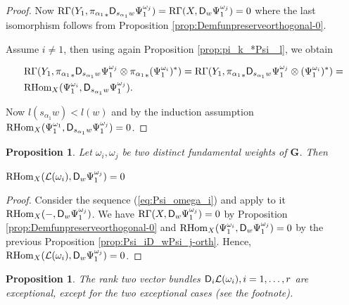 \documentclass[sn-mathphys-num]{sn-jnl}%
\newcommand{\Ll}{\mathcal L}
\newcommand*{\RGamma}{\mathop{\mathrm {R\Gamma}}\nolimits}
\newcommand*{\RHom}{\mathop{\mathrm {RHom}}\nolimits}
\newcommand{\sd}{\sf D}
\newcommand{\bg}{\mathbf G}
\newtheorem{proposition}[theorem]{Proposition}
\theoremstyle{definition}
\begin{document}
\begin{proof}
Now $\RGamma (Y_1,{\pi _{\alpha _1}}_{\ast}{\sf D}_{s_{\alpha _1}w}\Psi _1^{\omega _j})=\RGamma (X,{\sf D}_w\Psi _1^{\omega _j})=0$ where the last isomorphism follows from Proposition \ref{prop:Demfunpreserveorthogonal-0}. 

Assume $i\neq 1$, then using again Proposition \ref{prop:pi_k_*Psi _l}, we obtain

\begin{eqnarray}\label{eq:refeq}
& \RGamma (Y_1,{\pi _{\alpha _1}}_{\ast}{\sf D}_{s_{\alpha _1}w}\Psi _1^{\omega _j}\otimes {\pi _{\alpha _1}}_{\ast}(\Psi _1^{\omega _i})^{\ast})=\RGamma (Y_1,{\pi _{\alpha _1}}_{\ast}{\sf D}_{s_{\alpha _1}w}\Psi _1^{\omega _j}\otimes (\Psi _1^{\omega _i})^{\ast})= \\ \nonumber & \RHom _X(\Psi _1^{\omega _i},{\sf D}_{s_{\alpha _1}w}\Psi _1^{\omega _j}).
\end{eqnarray}

Now $l(s_{\alpha _1}w)<l(w)$ and by the induction assumption $\RHom _X(\Psi _1^{\omega _1},{\sf D}_{s_{\alpha _1}w}\Psi _1^{\omega _j})=0$. 
\end{proof}

\begin{proposition}\label{prop:orthogon_omega-to-Demazure-Psis}
Let $\omega _i, \omega _j$ be two distinct fundamental weights of $ \bg$. Then 

$\RHom _X(\Ll (\omega _i),{\sf D}_w\Psi _1^{\omega _j})=0$

\end{proposition}

\begin{proof}
Consider the sequence (\ref{eq:Psi_omega_i}) and apply to it $\RHom _X(-,{\sf D}_w\Psi _1^{\omega _j})$. We have $\RGamma (X,{\sf D}_w\Psi _1^{\omega _j})=0$ by Proposition \ref{prop:Demfunpreserveorthogonal-0} and $\RHom _X(\Psi _1^{\omega _i},{\sf D}_w\Psi _1^{\omega _j})=0$ by the previous Proposition \ref{prop:Psi_iD_wPsi_j-orth}. Hence, $\RHom _X(\Ll (\omega _i),{\sf D}_w\Psi _1^{\omega _j})=0$.
\end{proof}


\begin{proposition}\label{prop:exceptionality_D_i}
The rank two vector bundles ${\sd}_i\Ll (\omega _i), i=1,\dots ,r$ are  exceptional, except for the two exceptional cases (see the footnote).
\end{proposition}
\end{document}
